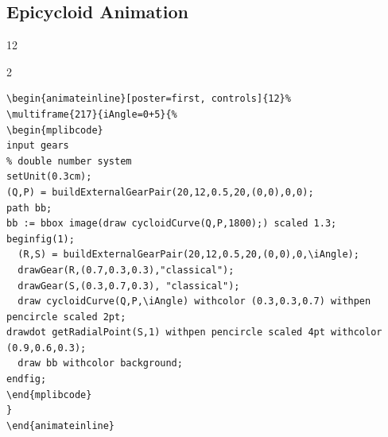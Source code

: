 \documentclass[english]{ltxdoc}
\begin{document}
\begin{landscape}
\subsection{Epicycloid Animation}

\begin{center}
\begin{animateinline}[poster=first, controls]{12}%
\end{animateinline}

\end{center}
\begin{multicols}{2}
  \begin{lstlisting}
\begin{animateinline}[poster=first, controls]{12}%
\multiframe{217}{iAngle=0+5}{%
\begin{mplibcode}
input gears
% double number system
setUnit(0.3cm);
(Q,P) = buildExternalGearPair(20,12,0.5,20,(0,0),0,0);
path bb;
bb := bbox image(draw cycloidCurve(Q,P,1800);) scaled 1.3; 
beginfig(1);
  (R,S) = buildExternalGearPair(20,12,0.5,20,(0,0),0,\iAngle);
  drawGear(R,(0.7,0.3,0.3),"classical");
  drawGear(S,(0.3,0.7,0.3), "classical");
  draw cycloidCurve(Q,P,\iAngle) withcolor (0.3,0.3,0.7) withpen pencircle scaled 2pt;
drawdot getRadialPoint(S,1) withpen pencircle scaled 4pt withcolor
(0.9,0.6,0.3);
  draw bb withcolor background;
endfig;
\end{mplibcode}
}
\end{animateinline}
  \end{lstlisting}
\end{multicols}
\end{landscape}
\end{document}
